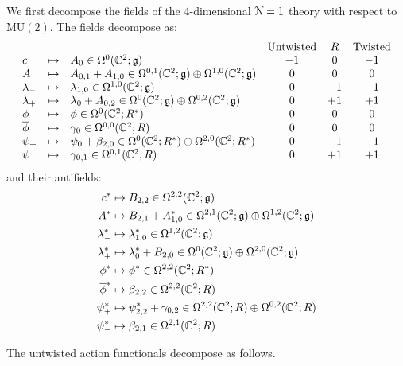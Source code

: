 \documentclass[10pt, oneside]{article}
\newcommand{\MU}{\mathrm{MU}}
\begin{document}
We first decompose the fields of the 4-dimensional $\mathcal{N}=1$ theory with respect to $\MU(2)$.
The fields decompose as:
\[
\begin{array} {lllcccccc}
& &  & {\rm Untwisted} & R & {\rm Twisted}  \\
c & \mapsto & A_{0} \in \Omega^0(\mathbb C^2 ; \mathfrak g) & -1 & 0 & -1 \\
A & \mapsto & A_{0,1} + A_{1,0} \in \Omega^{0,1}(\mathbb C^2 ; \mathfrak g) \oplus \Omega^{1,0}(\mathbb C^2 ; \mathfrak g) & 0 & 0 & 0 \\
\lambda_- & \mapsto & \lambda_{1,0} \in \Omega^{1,0}(\mathbb C^2 ; \mathfrak g) & 0 & -1 & -1 \\
\lambda_+ & \mapsto & \lambda_0 + A_{0,2} \in \Omega^{0}(\mathbb C^2 ; \mathfrak g) \oplus \Omega^{0,2}(\mathbb C^2 ; \mathfrak g) & 0 & +1 & + 1 \\
\phi & \mapsto & \phi \in \Omega^0 (\mathbb C^2 ; R^*) & 0 & 0 & 0 \\
\overline{\phi} & \mapsto & \gamma_0 \in \Omega^{0,0}(\mathbb C^2 ; R) & 0 & 0 & 0 \\
\psi_+ & \mapsto & \psi_0 + \beta_{2,0} \in \Omega^{0}(\mathbb C^2 ; R^*) \oplus \Omega^{2,0}(\mathbb C^2 ; R^*) & 0 & -1 & -1 \\
\psi_- & \mapsto & \gamma_{0,1} \in \Omega^{0,1}(\mathbb C^2 ; R) & 0 & +1 & +1 
\end{array}
\]
and their antifields:
\begin{align*}
c^* & \mapsto B_{2,2} \in \Omega^{2,2}(\mathbb C^2 ; \mathfrak g) \\
A^* & \mapsto B_{2,1} + A^*_{1,0} \in \Omega^{2,1}(\mathbb C^2;\mathfrak g) \oplus \Omega^{1,2}(\mathbb C^2; \mathfrak g) \\
\lambda^*_- & \mapsto \lambda_{1,0}^* \in \Omega^{1,2}(\mathbb C^2 ; \mathfrak g) \\
\lambda^*_+ & \mapsto \lambda_0^*+ B_{2,0} \in \Omega^{0}(\mathbb C^2 ; \mathfrak g) \oplus \Omega^{2,0}(\mathbb C^2 ; \mathfrak g) \\
\phi^* & \mapsto \phi^* \in \Omega^{2,2}(\mathbb C^2 ; R^*) \\
\overline{\phi}^* & \mapsto \beta_{2,2} \in \Omega^{2,2} (\mathbb C^2 ; R) \\
\psi^*_+ & \mapsto \psi_{2,2}^* + \gamma_{0,2} \in \Omega^{2,2}(\mathbb C^2 ; R) \oplus \Omega^{0,2}(\mathbb C^2 ; R) \\
\psi^*_- & \mapsto \beta_{2,1} \in \Omega^{2,1}(\mathbb C^2 ; R)
\end{align*}

The untwisted action functionals decompose as follows.
\end{document}
